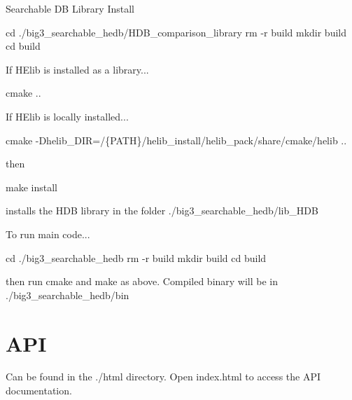 Searchable DB Library Install 
\begin{DoxyCode}
cd ./big3\_searchable\_hedb/HDB\_comparison\_library
rm -r build
mkdir build
cd build
\end{DoxyCode}
 If H\+Elib is installed as a library... 
\begin{DoxyCode}
cmake ..
\end{DoxyCode}
 If H\+Elib is locally installed... 
\begin{DoxyCode}
cmake -Dhelib\_DIR=/\{PATH\}/helib\_install/helib\_pack/share/cmake/helib ..
\end{DoxyCode}
 then 
\begin{DoxyCode}
make install
\end{DoxyCode}
 installs the H\+DB library in the folder ./big3\+\_\+searchable\+\_\+hedb/lib\+\_\+\+H\+DB

To run main code... 
\begin{DoxyCode}
cd ./big3\_searchable\_hedb
rm -r build
mkdir build
cd build
\end{DoxyCode}
 then run cmake and make as above. Compiled binary will be in ./big3\+\_\+searchable\+\_\+hedb/bin

\section*{A\+PI}

Can be found in the ./html directory. Open index.\+html to access the A\+PI documentation. 